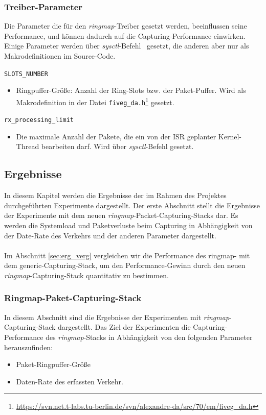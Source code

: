 {\subsubsection{Treiber-Parameter}
Die Parameter die für den \emph{ringmap}-Treiber gesetzt werden, beeinflussen
seine Performance, und können dadurch auf die Capturing-Performance einwirken.
Einige Parameter werden über \emph{sysctl}-Befehl~\cite{man_sysctl} gesetzt,
die anderen aber nur als Makrodefinitionen im Source-Code.
%
\begin{description}
	\item \verb+SLOTS_NUMBER+
		\begin{itemize}
			\item Ringpuffer-Größe: Anzahl der Ring-Slots bzw. der
				Paket-Puffer. Wird als Makrodefinition in der Datei
				\verb+fiveg_da.h+\footnote{\url{https://svn.net.t-labs.tu-berlin.de/svn/alexandre-da/src/70/em/fiveg_da.h}} gesetzt.
		\end{itemize}
	\item \verb+rx_processing_limit+
		\begin{itemize}
			\item Die maximale Anzahl der Pakete, die ein von der ISR geplanter
				Kernel-Thread bearbeiten darf. Wird über \emph{sysctl}-Befehl
				gesetzt. 
		\end{itemize}
\end{description}
}
\subsection{Ergebnisse}\label{sec:test_ergebnisse}
In diesem Kapitel werden die Ergebnisse der im Rahmen des Projektes
durchgeführten Experimente dargestellt. Der erste Abschnitt stellt die
Ergebnisse der Experimente mit dem neuen \emph{ringmap}-Packet-Capturing-Stacks dar. Es
werden die Systemload und Paketverluste beim Capturing in Abhängigkeit von der
Date-Rate des Verkehrs und der anderen Parameter dargestellt.\\\\
% 
Im Abschnitt \ref{sec:erg_verg} vergleichen wir die Performance des ringmap-
mit dem generic-Capturing-Stack, um den Performance-Gewinn durch den neuen
\emph{ringmap}-Capturing-Stack quantitativ zu bestimmen.

\subsubsection{Ringmap-Paket-Capturing-Stack}\label{sec:erg_ringmap_stack}
In diesem Abschnitt sind die Ergebnisse der Experimenten mit \emph{ringmap}-Capturing-Stack
dargestellt. Das Ziel der Experimenten die Capturing-Performance des \emph{ringmap}-Stacks 
in Abhängigkeit von den folgenden Parameter herauszufinden:
\begin{itemize}
	\item Paket-Ringpuffer-Größe
	\item Daten-Rate des erfassten Verkehr.
\end{itemize}

